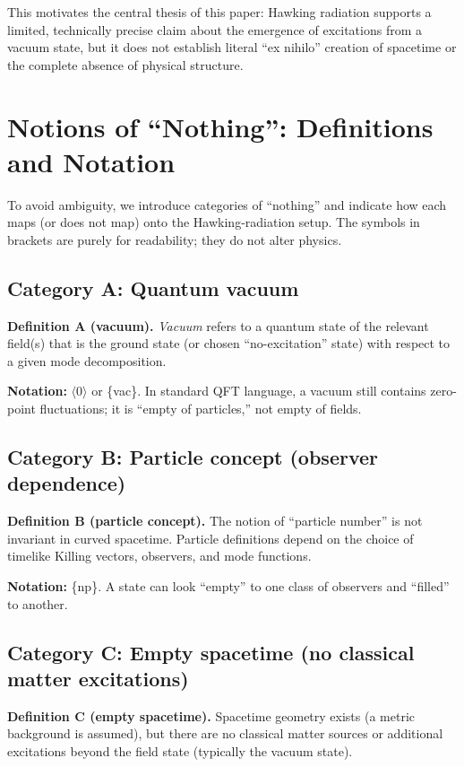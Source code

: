 \documentclass[11pt,a4paper]{article}
\begin{document}
This motivates the central thesis of this paper: Hawking radiation supports a limited, technically precise claim about the emergence of excitations from a vacuum state, but it does not establish literal ``ex nihilo'' creation of spacetime or the complete absence of physical structure.

\section{Notions of ``Nothing'': Definitions and Notation}
To avoid ambiguity, we introduce categories of ``nothing'' and indicate how each maps (or does not map) onto the Hawking-radiation setup. The symbols in brackets are purely for readability; they do not alter physics.

\subsection{Category A: Quantum vacuum}
\textbf{Definition A (vacuum).} \emph{Vacuum} refers to a quantum state of the relevant field(s) that is the ground state (or chosen ``no-excitation'' state) with respect to a given mode decomposition.

\medskip
\noindent \textbf{Notation:} $\langle 0\rangle$ or \{vac\}.
In standard QFT language, a vacuum still contains zero-point fluctuations; it is ``empty of particles,'' not empty of fields.

\subsection{Category B: Particle concept (observer dependence)}
\textbf{Definition B (particle concept).} The notion of ``particle number'' is not invariant in curved spacetime. Particle definitions depend on the choice of timelike Killing vectors, observers, and mode functions.

\medskip
\noindent \textbf{Notation:} \{np\}.
A state can look ``empty'' to one class of observers and ``filled'' to another.

\subsection{Category C: Empty spacetime (no classical matter excitations)}
\textbf{Definition C (empty spacetime).} Spacetime geometry exists (a metric background is assumed), but there are no classical matter sources or additional excitations beyond the field state (typically the vacuum state).
\end{document}

